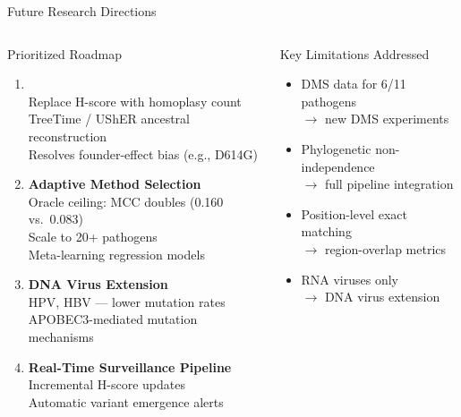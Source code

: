 \begin{frame}{Future Research Directions}
  \begin{columns}[T]
    \begin{block}{Prioritized Roadmap}
      \begin{enumerate}
        \item {} \\
              Replace H-score with homoplasy count \\
              TreeTime / UShER ancestral reconstruction \\
              Resolves founder-effect bias (e.g., D614G)

        \vspace{0.3em}
        \item \textbf{Adaptive Method Selection} \\
              Oracle ceiling: MCC doubles (0.160 vs.\ 0.083) \\
              Scale to 20+ pathogens \\
              Meta-learning regression models

        \vspace{0.3em}
        \item \textbf{DNA Virus Extension} \\
              HPV, HBV --- lower mutation rates \\
              APOBEC3-mediated mutation mechanisms

        \vspace{0.3em}
        \item \textbf{Real-Time Surveillance Pipeline} \\
              Incremental H-score updates \\
              Automatic variant emergence alerts
      \end{enumerate}
    \end{block}

    \begin{block}{Key Limitations Addressed}
      \begin{itemize}
        \item DMS data for 6/11 pathogens \\
              $\rightarrow$ new DMS experiments
        \item Phylogenetic non-independence \\
              $\rightarrow$ full pipeline integration
        \item Position-level exact matching \\
              $\rightarrow$ region-overlap metrics
        \item RNA viruses only \\
              $\rightarrow$ DNA virus extension
      \end{itemize}
    \end{block}


\end{columns}
\end{frame}
